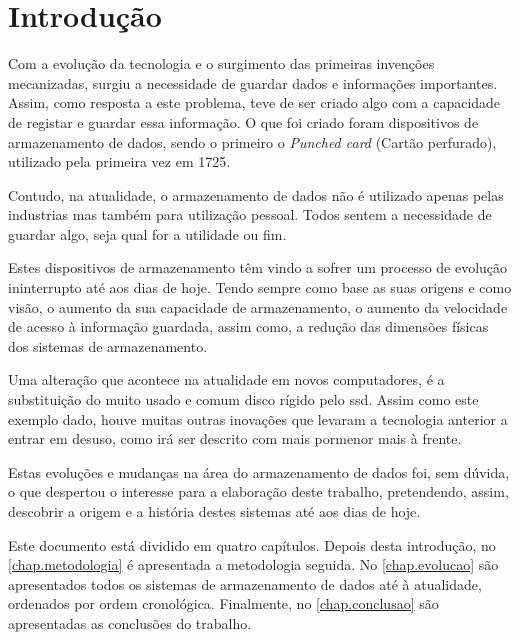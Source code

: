 \documentclass{report}
\begin{document}
\chapter{Introdução}
\label{chap.introducao}
	Com a evolução da tecnologia e o surgimento das primeiras invenções mecanizadas, surgiu a necessidade de guardar dados e informações importantes. Assim, como resposta a este problema, teve de ser criado algo com a capacidade de registar e guardar essa informação. O que foi criado foram dispositivos de armazenamento de dados, sendo o primeiro o \textit{Punched card} (Cartão perfurado), utilizado pela primeira vez em 1725. 
\vspace{1mm}
	
	Contudo, na atualidade, o armazenamento de dados não é utilizado apenas pelas industrias mas também para utilização pessoal. Todos sentem a necessidade de guardar algo, seja qual for a utilidade ou fim.
\vspace{1mm}
	
	Estes dispositivos de armazenamento têm vindo a sofrer um processo de evolução ininterrupto até aos dias de hoje. Tendo sempre como base as suas origens e como visão, o aumento da sua capacidade de armazenamento, o aumento da velocidade de acesso à informação guardada, assim como, a redução das dimensões físicas dos sistemas de armazenamento.
\vspace{1mm}
	
	Uma alteração que acontece na atualidade em novos computadores, é a substituição do muito usado e comum disco rígido pelo \ac{ssd}. Assim como este exemplo dado, houve muitas outras inovações que levaram a tecnologia anterior a entrar em desuso, como irá ser descrito com mais pormenor mais à frente.
\vspace{2mm}

	Estas evoluções e mudanças na área do armazenamento de dados foi, sem dúvida, o que despertou o interesse para a elaboração deste trabalho, pretendendo, assim, descobrir a origem e a história destes sistemas até aos dias de hoje.
\vspace{2mm}


Este documento está dividido em quatro capítulos.
Depois desta introdução, no \autoref{chap.metodologia} é apresentada a metodologia seguida.
	No \autoref{chap.evolucao} são apresentados todos os sistemas de armazenamento de dados até à atualidade, ordenados por ordem cronológica. 
	Finalmente, no \autoref{chap.conclusao} são apresentadas
as conclusões do trabalho.
\end{document}

